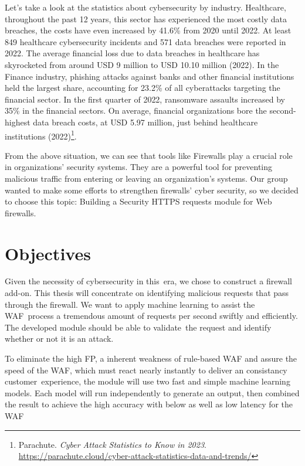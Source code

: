 Let's take a look at the statistics about cybersecurity by industry. Healthcare, throughout the past 12 years, this sector has experienced the most costly data breaches, the costs have even increased by 41.6\% from 2020 until 2022. At least 849 healthcare cybersecurity incidents and 571 data breaches were reported in 2022. The average financial loss due to data breaches in healthcare has skyrocketed from around USD 9 million to USD 10.10 million (2022). In the Finance industry, phishing attacks against banks and other financial institutions held the largest share, accounting for 23.2\% of all cyberattacks targeting the financial sector. In the first quarter of 2022, ransomware assaults increased by 35\% in the financial sectors. On average, financial organizations bore the second-highest data breach costs, at USD 5.97 million, just behind healthcare institutions (2022)\footnote{Parachute. \textit{Cyber Attack Statistics to Know in 2023}. \url{https://parachute.cloud/cyber-attack-statistics-data-and-trends/}}. 

From the above situation, we can see that tools like Firewalls play a crucial role in organizations' security systems. They are a powerful tool for preventing malicious traffic from entering or leaving an organization’s systems. Our group wanted to make some efforts to strengthen firewalls' cyber security, so we decided to choose this topic: Building a Security HTTPS requests module for Web firewalls.
\section{Objectives}
\label{sec:objectives}
Given the necessity of cybersecurity in this era, we chose to construct a firewall add-on. This thesis will concentrate on identifying malicious requests that pass through the firewall. We want to apply machine learning to assist the WAF process a tremendous amount of requests per second swiftly and efficiently. The developed module should be able to validate the request and identify whether or not it is an attack.

To eliminate the high FP, a inherent weakness of rule-based WAF and assure the speed of the WAF, which must react nearly instantly to deliver an consistancy customer experience, the module will use two fast and simple machine learning models. Each model will run independently to generate an output, then combined the result to achieve the high accuracy with below  as well as low latency for the WAF

